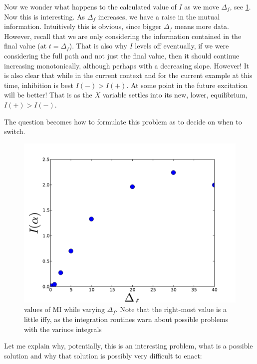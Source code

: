 \documentclass{article}
\begin{document}
Now we wonder what happens to the calculated value of $I$ as we move $\Delta_f$,
see \cref{fig:MI_delta_f_variation}. Now this is interesting. As $\Delta_f$
increases, we have a raise in the mutual information. Intuitively this is
obvious, since bigger $\Delta_f$ means more data. However, recall that we are
only considering the information contained in the final value (at $t=\Delta_f$).
That is also why $I$ levels off eventually, if we were considering the full path
and not just the final value, then it should continue increasing monotonically,
although perhaps with a decreasing slope. However! It is also clear that while
in the current context and for the current example at this time, inhibition is
best $I(-) > I(+)$. At some point in the future excitation will be better! That
is as the $X$ variable settles into its new, lower, equilibrium, $I(+) > I(-)$.

The question becomes how to formulate this problem as to decide on when to
switch. 

\begin{figure}[htp]
\begin{center}
  \includegraphics[width=1\textwidth]{Figs/MI/forward_deltas_vs_MIs.pdf}
\caption{values of MI while varying $\Delta_f$. Note that the right-most value
is a little iffy, as the integration routines warn about possible problems with
the variuos integrals}
	\label{fig:MI_delta_f_variation}
\end{center}
\end{figure}
Let me explain why, potentially, this is an interesting problem, what is a
possible solution and why that solution is possibly very difficult to enact:
\end{document}
